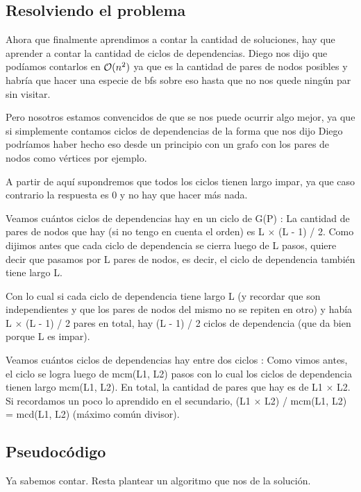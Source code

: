 \subsection{Resolviendo el problema}
	Ahora que finalmente aprendimos a contar la cantidad de soluciones, hay que aprender a contar la cantidad de ciclos de dependencias. Diego nos dijo que podíamos contarlos en $\mathcal{O}(n^{2})$ ya que es la cantidad de pares de nodos posibles y habría que hacer una especie de bfs sobre eso hasta que no nos quede ningún par sin visitar. \newline

	Pero nosotros estamos convencidos de que se nos puede ocurrir algo mejor, ya que si simplemente contamos ciclos de dependencias de la forma que nos dijo Diego podríamos haber hecho eso desde un principio con un grafo con los pares de nodos como vértices por ejemplo. \newline

	A partir de aquí supondremos que todos los ciclos tienen largo impar, ya que caso contrario la respuesta es 0 y no hay que hacer más nada. \newline

	Veamos cuántos ciclos de dependencias hay en un ciclo de G(P) : La cantidad de pares de nodos que hay (si no tengo en cuenta el orden) es L $\times$ (L - 1) / 2. Como dijimos antes que cada ciclo de dependencia se cierra luego de L pasos, quiere decir que pasamos por L pares de nodos, es decir, el ciclo de dependencia también tiene largo L. \newline  

	Con lo cual si cada ciclo de dependencia tiene largo L (y recordar que son independientes y que los pares de nodos del mismo no se repiten en otro) y había L $\times$ (L - 1) / 2 pares en total, hay (L - 1) / 2 ciclos de dependencia (que da bien porque L es impar). \newline  

	Veamos cuántos ciclos de dependencias hay entre dos ciclos : Como vimos antes, el ciclo se logra luego de mcm(L1, L2) pasos con lo cual los ciclos de dependencia tienen largo mcm(L1, L2). En total, la cantidad de pares que hay es de L1 $\times$ L2. Si recordamos un poco lo aprendido en el secundario, (L1 $\times$ L2) / mcm(L1, L2) = mcd(L1, L2) (máximo común divisor). \newline


\subsection{Pseudocódigo}
	Ya sabemos contar. Resta plantear un algoritmo que nos de la solución.

